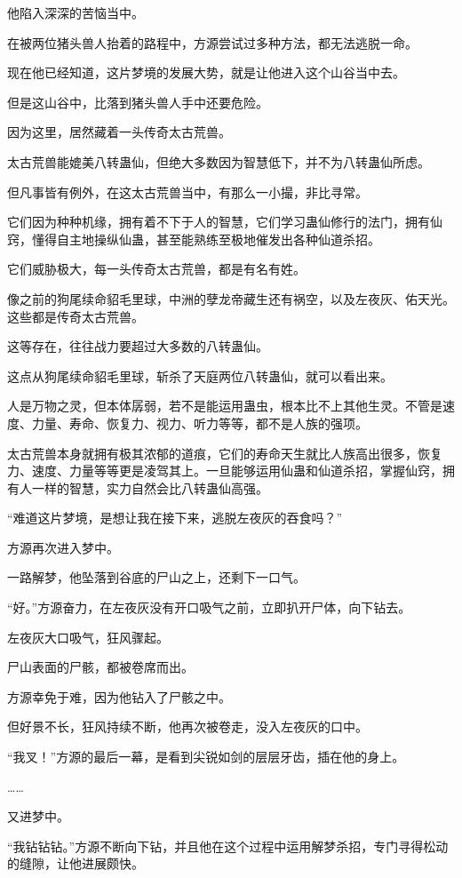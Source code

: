 \begin{this_body}
他陷入深深的苦恼当中。

在被两位猪头兽人抬着的路程中，方源尝试过多种方法，都无法逃脱一命。

现在他已经知道，这片梦境的发展大势，就是让他进入这个山谷当中去。

但是这山谷中，比落到猪头兽人手中还要危险。

因为这里，居然藏着一头传奇太古荒兽。

太古荒兽能媲美八转蛊仙，但绝大多数因为智慧低下，并不为八转蛊仙所虑。

但凡事皆有例外，在这太古荒兽当中，有那么一小撮，非比寻常。

它们因为种种机缘，拥有着不下于人的智慧，它们学习蛊仙修行的法门，拥有仙窍，懂得自主地操纵仙蛊，甚至能熟练至极地催发出各种仙道杀招。

它们威胁极大，每一头传奇太古荒兽，都是有名有姓。

像之前的狗尾续命貂毛里球，中洲的孽龙帝藏生还有祸空，以及左夜灰、佑天光。这些都是传奇太古荒兽。

这等存在，往往战力要超过大多数的八转蛊仙。

这点从狗尾续命貂毛里球，斩杀了天庭两位八转蛊仙，就可以看出来。

人是万物之灵，但本体孱弱，若不是能运用蛊虫，根本比不上其他生灵。不管是速度、力量、寿命、恢复力、视力、听力等等，都不是人族的强项。

太古荒兽本身就拥有极其浓郁的道痕，它们的寿命天生就比人族高出很多，恢复力、速度、力量等等更是凌驾其上。一旦能够运用仙蛊和仙道杀招，掌握仙窍，拥有人一样的智慧，实力自然会比八转蛊仙高强。

“难道这片梦境，是想让我在接下来，逃脱左夜灰的吞食吗？”

方源再次进入梦中。

一路解梦，他坠落到谷底的尸山之上，还剩下一口气。

“好。”方源奋力，在左夜灰没有开口吸气之前，立即扒开尸体，向下钻去。

左夜灰大口吸气，狂风骤起。

尸山表面的尸骸，都被卷席而出。

方源幸免于难，因为他钻入了尸骸之中。

但好景不长，狂风持续不断，他再次被卷走，没入左夜灰的口中。

“我叉！”方源的最后一幕，是看到尖锐如剑的层层牙齿，插在他的身上。

……

又进梦中。

“我钻钻钻。”方源不断向下钻，并且他在这个过程中运用解梦杀招，专门寻得松动的缝隙，让他进展颇快。


\end{this_body}
